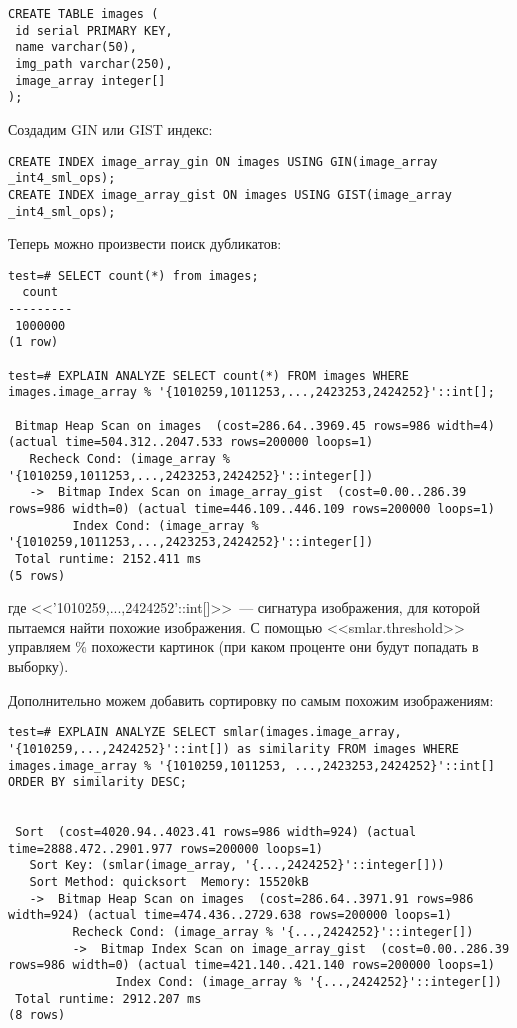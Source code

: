 \begin{lstlisting}[label=lst:smlar8,caption=Таблица для изображений]
CREATE TABLE images (
 id serial PRIMARY KEY,
 name varchar(50),
 img_path varchar(250),
 image_array integer[]
);
\end{lstlisting}

Создадим GIN или GIST индекс:

\begin{lstlisting}[label=lst:smlar9,caption=Создание GIN или GIST индекса]
CREATE INDEX image_array_gin ON images USING GIN(image_array _int4_sml_ops);
CREATE INDEX image_array_gist ON images USING GIST(image_array _int4_sml_ops);
\end{lstlisting}

Теперь можно произвести поиск дубликатов:

\begin{lstlisting}[label=lst:smlar10,caption=Поиск дубликатов]
test=# SELECT count(*) from images;
  count 
---------
 1000000
(1 row)

test=# EXPLAIN ANALYZE SELECT count(*) FROM images WHERE images.image_array % '{1010259,1011253,...,2423253,2424252}'::int[];

 Bitmap Heap Scan on images  (cost=286.64..3969.45 rows=986 width=4) (actual time=504.312..2047.533 rows=200000 loops=1)
   Recheck Cond: (image_array % '{1010259,1011253,...,2423253,2424252}'::integer[])
   ->  Bitmap Index Scan on image_array_gist  (cost=0.00..286.39 rows=986 width=0) (actual time=446.109..446.109 rows=200000 loops=1)
         Index Cond: (image_array % '{1010259,1011253,...,2423253,2424252}'::integer[])
 Total runtime: 2152.411 ms
(5 rows)
\end{lstlisting}

где <<'{1010259,...,2424252}'::int[]>>~--- сигнатура изображения, для которой пытаемся найти похожие изображения. С помощью <<smlar.threshold>> управляем \% похожести картинок (при каком проценте они будут попадать в выборку).

Дополнительно можем добавить сортировку по самым похожим изображениям:

\begin{lstlisting}[label=lst:smlar11,caption=Добавляем сортировку по сходству картинок]
test=# EXPLAIN ANALYZE SELECT smlar(images.image_array, '{1010259,...,2424252}'::int[]) as similarity FROM images WHERE images.image_array % '{1010259,1011253, ...,2423253,2424252}'::int[] ORDER BY similarity DESC; 


 Sort  (cost=4020.94..4023.41 rows=986 width=924) (actual time=2888.472..2901.977 rows=200000 loops=1)
   Sort Key: (smlar(image_array, '{...,2424252}'::integer[]))
   Sort Method: quicksort  Memory: 15520kB
   ->  Bitmap Heap Scan on images  (cost=286.64..3971.91 rows=986 width=924) (actual time=474.436..2729.638 rows=200000 loops=1)
         Recheck Cond: (image_array % '{...,2424252}'::integer[])
         ->  Bitmap Index Scan on image_array_gist  (cost=0.00..286.39 rows=986 width=0) (actual time=421.140..421.140 rows=200000 loops=1)
               Index Cond: (image_array % '{...,2424252}'::integer[])
 Total runtime: 2912.207 ms
(8 rows)
\end{lstlisting}

